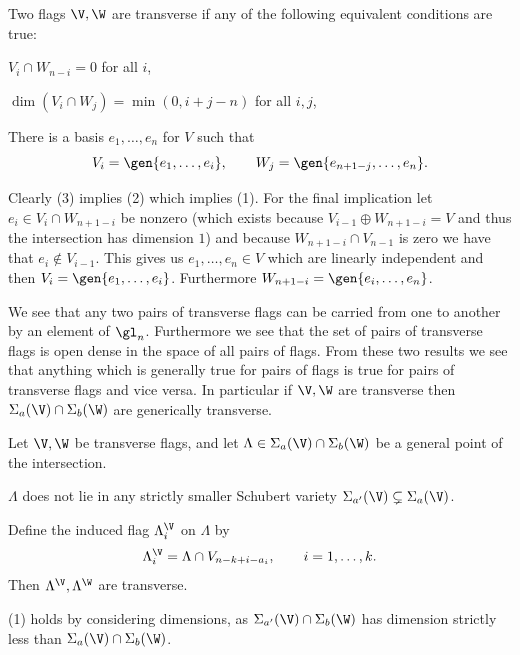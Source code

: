 \bdefn

    Two flags $\V,\W$ are {\emphcolor transverse} if any of the following equivalent conditions are true:
    \benum
        \item $V_i\cap W_{n-i}=0$ for all $i$,
        \item $\dim(V_i\cap W_j)=\min(0,i+j-n)$ for all $i,j$,
        \item There is a basis $e_1,\dots,e_n$ for $V$ such that
        $$ V_i = \gen{e_1,\dots,e_i},\qquad W_j = \gen{e_{n+1-j},\dots,e_n} . $$
    \eenum

\edefn

\bnote

    Clearly (3) implies (2) which implies (1).
    For the final implication let $e_i\in V_i\cap W_{n+1-i}$ be nonzero (which exists because
    $V_{i-1}\oplus W_{n+1-i}=V$ and thus the intersection has dimension $1$) and because
    $W_{n+1-i}\cap V_{n-1}$ is zero we have that $e_i\notin V_{i-1}$.
    This gives us $e_1,\dots,e_n\in V$ which are linearly independent and then $V_i=\gen{e_1,\dots,e_i}$.
    Furthermore $W_{n+1-i}=\gen{e_i,\dots,e_n}$.

\enote

We see that any two pairs of transverse flags can be carried from one to another by an element of $\gl_n$.
Furthermore we see that the set of pairs of transverse flags is open dense in the space of all pairs of flags.
From these two results we see that anything which is generally true for pairs of flags is true for
pairs of transverse flags and vice versa.
In particular if $\V,\W$ are transverse then $\Sigma_a(\V)\cap\Sigma_b(\W)$ are generically transverse.

\blemm

    Let $\V,\W$ be transverse flags, and let $\Lambda\in\Sigma_a(\V)\cap\Sigma_b(\W)$ be a general point
    of the intersection.
    \benum
        \item $\Lambda$ does not lie in any strictly smaller Schubert variety
        $\Sigma_{a'}(\V)\subsetneq\Sigma_a(\V)$.
        \item Define the induced flag $\Lambda^\V_i$ on $\Lambda$ by
        $$ \Lambda^\V_i = \Lambda \cap V_{n-k+i-a_i},\qquad i=1,\dots,k . $$
        Then $\Lambda^\V,\Lambda^\W$ are transverse.
    \eenum

\elemm

\bproof

    (1) holds by considering dimensions, as $\Sigma_{a'}(\V)\cap\Sigma_b(\W)$ has dimension strictly
    less than $\Sigma_a(\V)\cap\Sigma_b(\W)$.

